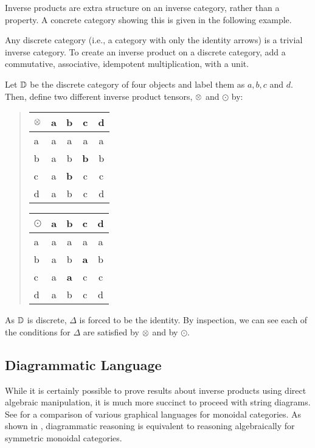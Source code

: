 Inverse products are extra structure on an inverse category, rather than a property. A concrete
category showing this is given in the following example.

\begin{example}
  \label{example:invprodisstructure}
\end{example}
Any discrete category (i.e., a category with only the identity arrows) is a trivial inverse
category. To create an inverse product on a discrete category, add a commutative, associative,
idempotent multiplication, with a unit.

Let $\mathbb{D}$ be the discrete category of four objects and label them as $a,b,c$ and $d$. Then, define
two different inverse product tensors, $\otimes$ and $\odot$ by:
\begin{quote}
  \qquad\qquad
  \begin{tabular}{|l||c|c|c|c|}
    \hline
    $\otimes$&a&b&c&d\\ \hline \hline
    a&a&a&a&a\\ \hline
    b&a&b&\textbf{b}&b\\ \hline
    c&a&\textbf{b}&c&c \\ \hline
    d&a&b&c&d \\ \hline
  \end{tabular}
  \hfil
  \begin{tabular}{|l||c|c|c|c|}
    \hline
    $\odot$&a&b&c&d\\ \hline \hline
    a&a&a&a&a\\ \hline
    b&a&b&\textbf{a}&b\\ \hline
    c&a&\textbf{a}&c&c \\ \hline
    d&a&b&c&d \\ \hline
  \end{tabular}
  \qquad \qquad
\end{quote}

As $\mathbb{D}$ is discrete, $\Delta$ is forced to be the identity. By inspection, we can see each of
the conditions for $\Delta$ are satisfied by $\otimes$ and by $\odot$.

\subsection{Diagrammatic Language} %
\label{sub:diagrammatic_language}

While it is certainly possible to prove results about inverse products using direct algebraic
manipulation, it is much more succinct to proceed with string diagrams. See
\cite{selinger11:graphical} for a comparison of various graphical languages for monoidal categories.
As shown in
\cite{street-ross-1991-GTC-I}, diagrammatic reasoning is equivalent to reasoning algebraically for
symmetric monoidal categories.

